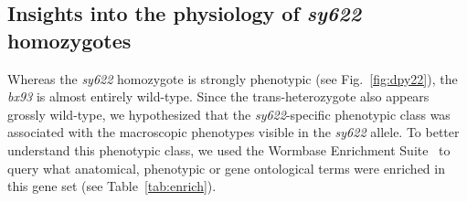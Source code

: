 \documentclass[10pt, onecolumn]{article}
\begin{document}
\subsection*{Insights into the physiology of \emph{sy622} homozygotes}
Whereas the \emph{sy622} homozygote is strongly phenotypic (see
Fig.~\ref{fig:dpy22}), the \emph{bx93} is almost entirely wild-type. Since the
trans-heterozygote also appears grossly wild-type, we hypothesized that the
\emph{sy622}-specific phenotypic class was associated with the macroscopic
phenotypes visible in the \emph{sy622} allele. To better understand this
phenotypic class, we used the Wormbase Enrichment
Suite~\cite{Angeles-Albores2016,Angeles-Albores106369} to query what anatomical,
phenotypic or gene ontological terms were enriched in this gene set (see
Table~\ref{tab:enrich}).
%
\end{document}
